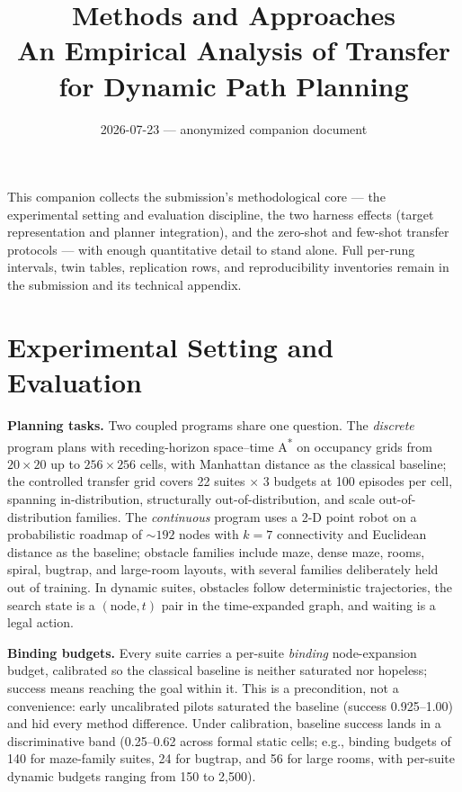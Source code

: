 \documentclass[11pt,letterpaper]{article}
\title{Methods and Approaches\\[0.3em]\large An Empirical Analysis of Transfer for Dynamic Path Planning}
\author{}
\date{2026-07-23 --- anonymized companion document}
\begin{document}
\maketitle

\noindent This companion collects the submission's methodological core --- the experimental setting and evaluation discipline, the two harness effects (target representation and planner integration), and the zero-shot and few-shot transfer protocols --- with enough quantitative detail to stand alone. Full per-rung intervals, twin tables, replication rows, and reproducibility inventories remain in the submission and its technical appendix.

\section{Experimental Setting and Evaluation}

\textbf{Planning tasks.} Two coupled programs share one question. The \emph{discrete} program plans with receding-horizon space--time A\textsuperscript{*} on occupancy grids from $20{\times}20$ up to $256{\times}256$ cells, with Manhattan distance as the classical baseline; the controlled transfer grid covers 22 suites $\times$ 3 budgets at 100 episodes per cell, spanning in-distribution, structurally out-of-distribution, and scale out-of-distribution families. The \emph{continuous} program uses a 2-D point robot on a probabilistic roadmap \citep[PRM;][]{kavraki1996prm} of ${\sim}192$ nodes with $k{=}7$ connectivity and Euclidean distance as the baseline; obstacle families include maze, dense maze, rooms, spiral, bugtrap, and large-room layouts, with several families deliberately held out of training. In dynamic suites, obstacles follow deterministic trajectories, the search state is a $(\text{node},t)$ pair in the time-expanded graph, and waiting is a legal action.

\textbf{Binding budgets.} Every suite carries a per-suite \emph{binding} node-expansion budget, calibrated so the classical baseline is neither saturated nor hopeless; success means reaching the goal within it. This is a precondition, not a convenience: early uncalibrated pilots saturated the baseline (success 0.925--1.00) and hid every method difference. Under calibration, baseline success lands in a discriminative band (0.25--0.62 across formal static cells; e.g., binding budgets of 140 for maze-family suites, 24 for bugtrap, and 56 for large rooms, with per-suite dynamic budgets ranging from 150 to 2{,}500).
\end{document}
